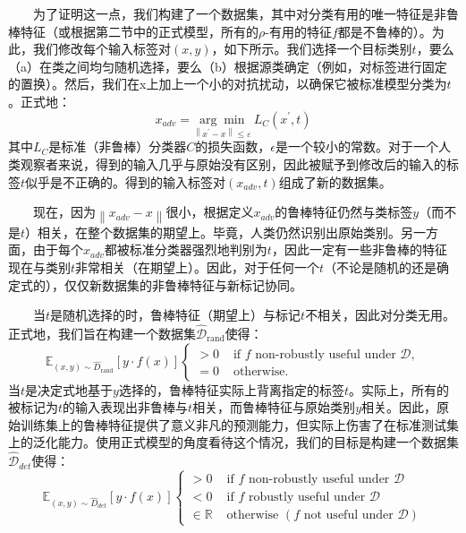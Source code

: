 \documentclass{article}
\begin{document}
\ \ \ \ 为了证明这一点，我们构建了一个数据集，其中对分类有用的唯一特征是非鲁棒特征（或根据第二节中的正式模型，所有的$\rho$-有用的特征$f$都是不鲁棒的）。为此，我们修改每个输入标签对$(x, y)$，如下所示。我们选择一个目标类别$t$，要么（a）在类之间均匀随机选择，要么（b）根据源类确定（例如，对标签进行固定的置换）。然后，我们在x上加上一个小的对抗扰动，以确保它被标准模型分类为$t$。正式地：
\begin{equation}
  x_{a d v}=\underset{\left\|x^{\prime}-x\right\| \leq \varepsilon}{\arg \min } \ L_{C}\left(x^{\prime}, t\right)
\end{equation}
其中$L_C$是标准（非鲁棒）分类器$C$的损失函数，$\epsilon$是一个较小的常数。对于一个人类观察者来说，得到的输入几乎与原始没有区别，因此被赋予到修改后的输入的标签$t$似乎是不正确的。得到的输入标签对$(x_{adv}, t)$组成了新的数据集。

\ \ \ \ 现在，因为$\left\|x_{a d v}-x\right\|$很小，根据定义$x_{adv}$的鲁棒特征仍然与类标签$y$（而不是$t$）相关，在整个数据集的期望上。毕竟，人类仍然识别出原始类别。另一方面，由于每个$x_{adv}$都被标准分类器强烈地判别为$t$，因此一定有一些非鲁棒的特征现在与类别$t$非常相关（在期望上）。因此，对于任何一个$t$（不论是随机的还是确定式的），仅仅新数据集的非鲁棒特征与新标记协同。

\ \ \ \ 当$t$是随机选择的时，鲁棒特征（期望上）与标记$t$不相关，因此对分类无用。正式地，我们旨在构建一个数据集$\widehat{\mathcal{D}}_{\text {rand}}$使得：
\begin{equation}
\mathbb{E}_{(x, y) \sim \widehat{D}_{\text {rand}}}[y \cdot f(x)] \left\{\begin{array}{ll}{>0} & {\text { if } f \text { non-robustly useful under } \mathcal{D},} \\ {=0} & {\text { otherwise. }}\end{array}\right.
\end{equation}
当$t$是决定式地基于$y$选择的，鲁棒特征实际上背离指定的标签$t$。实际上，所有的被标记为$t$的输入表现出非鲁棒与$t$相关，而鲁棒特征与原始类别$y$相关。因此，原始训练集上的鲁棒特征提供了意义非凡的预测能力，但实际上伤害了在标准测试集上的泛化能力。使用正式模型的角度看待这个情况，我们的目标是构建一个数据集$\widehat{\mathcal{D}}_{d e t}$使得：
\begin{equation}
\mathbb{E}_{(x, y) \sim \widehat{D}_{d e t}}[y \cdot f(x)] \left\{\begin{array}{ll}{>0} & {\text { if } f \text { non-robustly useful under } \mathcal{D}} \\ {<0} & {\text { if } f \text { robustly useful under } \mathcal{D}} \\ {\in \mathbb{R}} & {\text { otherwise }(f \text { not useful under } \mathcal{D})}\end{array}\right.
\end{equation}
\end{document}
